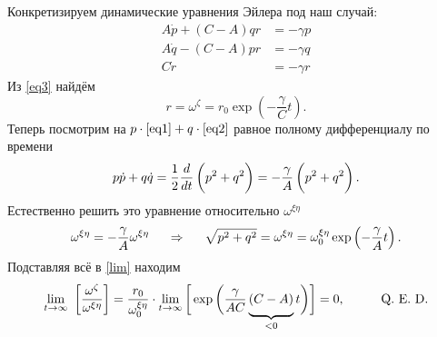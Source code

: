 Конкретизируем динамические уравнения Эйлера под наш случай:
\begin{align}
        A \dot{p} + (C-A) qr &= -\gamma p \label{eq1} \\
        A \dot{q} - (C-A) pr &= -\gamma q \label{eq2} \\
        C \dot{r} &= -\gamma r \label{eq3}
\end{align}
Из \eqref{eq3} найдём
\begin{equation*}
    r = \omega^{\zeta} = r_0 \exp \left(-\frac{\gamma}{C} t\right).
\end{equation*}
Теперь посмотрим на $p \cdot \eqref{eq1} + q \cdot \eqref{eq2}$ равное полному дифференциалу по времени
\begin{equation*}
    p \dot{p} + q \dot{q} = 
    \frac{1}{2} \frac{d }{d t} \left(p^2 + q^2 \vp \right)
    =
    - \frac{\gamma}{A} \left(\vp p^2 + q^2 \right).
\end{equation*}
Естественно решить это уравнение относительно $\omega^{\xi\eta}$
\begin{equation*}
    \omega^{\xi\eta} = - \frac{\gamma}{A} \omega^{\xi\eta}
    \hspace{0.5cm} \Rightarrow \hspace{0.5cm} 
    \sqrt{p^2+q^2} = \omega^{\xi\eta} = \omega^{\xi\eta}_0 
    \exp \left(-\frac{\gamma}{A} t\right).
\end{equation*}
Подставляя всё в \eqref{lim} находим
\begin{equation*}
    \lim_{t \to \infty} \ 
    \left[\frac{\omega^{\zeta}}{\omega^{\xi\eta}}\right] =
    \frac{r_0}{\omega^{\xi\eta}_0} \cdot
    \lim_{t \to \infty} 
\bigg[    \exp \bigg(
        \frac{\gamma}{AC} \underbrace{(C-A)\vp}_{<0} t
    \bigg) \bigg] = 0, 
    \hspace{1cm} 
    \text{Q. E. D.}
\end{equation*}


